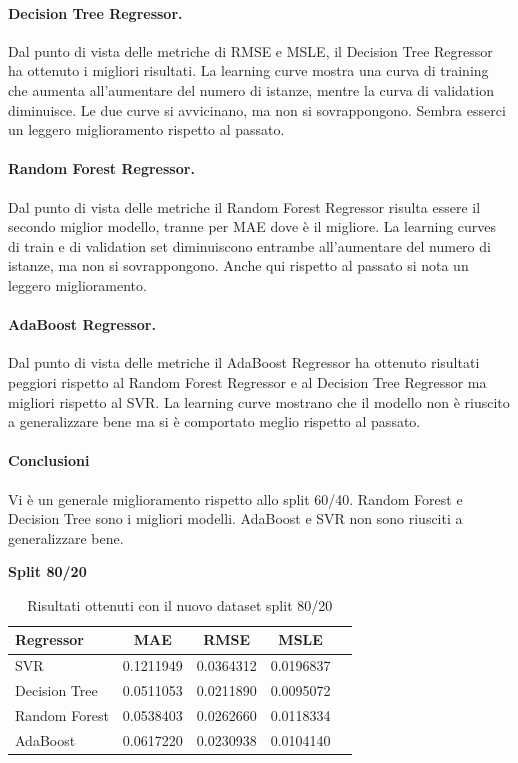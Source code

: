 \paragraph{\textbf{Decision Tree Regressor}.}
Dal punto di vista delle metriche di RMSE e MSLE, il Decision Tree Regressor ha ottenuto i migliori risultati. 
La learning curve mostra una curva di training che aumenta all'aumentare del numero di istanze, mentre la curva di validation diminuisce. Le due curve si avvicinano, ma non si sovrappongono. Sembra esserci un leggero miglioramento rispetto al passato.
\paragraph{\textbf{Random Forest Regressor}.}
Dal punto di vista delle metriche il Random Forest Regressor risulta essere il secondo miglior modello, tranne per MAE dove è il migliore.
La learning curves di train e di validation set diminuiscono entrambe all'aumentare del numero di istanze, ma non si sovrappongono. Anche qui rispetto al passato si nota un leggero miglioramento.
\paragraph{\textbf{AdaBoost Regressor}.}
Dal punto di vista delle metriche il AdaBoost Regressor ha ottenuto risultati peggiori rispetto al Random Forest Regressor e al Decision Tree Regressor ma migliori rispetto al SVR.
La learning curve mostrano che il modello non è riuscito a generalizzare bene ma si è comportato meglio rispetto al passato.


\paragraph{\textbf{Conclusioni}} Vi è un generale miglioramento rispetto allo split 60/40. Random Forest e Decision Tree sono i migliori modelli. AdaBoost e SVR non sono riusciti a generalizzare bene.



\noindent\textbf{Split 80/20}

\begin{table}[H]
    \centering
    \begin{tabular}{|>{\centering\arraybackslash}m{5cm}|c|c|c|c|}
        \hline
        \textbf{Regressor} & \textbf{MAE} & \textbf{RMSE} & \textbf{MSLE} \\ [10pt]
        \hline
        SVR & 0.1211949 & 0.0364312 & 0.0196837 \\ [10pt]
        \hline
        Decision Tree & 0.0511053 & 0.0211890 & 0.0095072 \\ [10pt]
        \hline
        Random Forest & 0.0538403 & 0.0262660 & 0.0118334 \\ [10pt]
        \hline
        AdaBoost & 0.0617220 & 0.0230938 & 0.0104140 \\ [10pt]
        \hline
    \end{tabular}
    \caption{Risultati ottenuti con il nuovo dataset split 80/20}
    \label{tab:results} 
\end{table}

